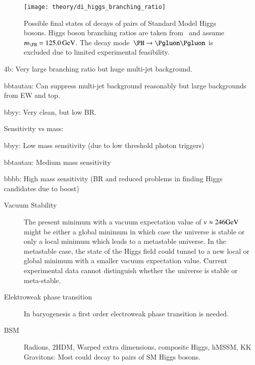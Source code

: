 \begin{figure}[htbp]
  \centering
  \texttt{[image: theory/di\_higgs\_branching\_ratio]}
  \caption{Possible final states of decays of pairs of Standard Model
    Higgs bosons. Higgs boson branching ratios are taken
    from~\cite{deFlorian:2016spz} and
    assume~$m_{\PH} = \SI{125.0}{\GeV}$. The decay
    mode~$\PH \ra \Pgluon\Pgluon$ is excluded due to limited
    experimental feasibility.}
  \label{fig:hh_branching_ratios}
\end{figure}

4b: Very large branching ratio but huge multi-jet background.

bbtautau: Can suppress multi-jet background reasonably but large
backgrounds from EW and top.

bbyy: Very clean, but low BR.

Sensitivity vs mass:

bbyy: Low mass sensitivity (due to low threshold photon triggers)

bbtautau: Medium mass sensitivity

bbbb: High mass sensitivity (BR and reduced problems in finding Higgs
candidates due to boost)


\begin{description}


\item[Vacuum Stability] The present minimum with a vacuum expectation
  value of $v \approx \si{246}{\ensuremath{\text{GeV}}}$ might be either a global minimum
  in which case the universe is stable or only a local minimum which
  leads to a metastable universe. In the metastable case, the state of
  the Higgs field could tunnel to a new local or global minimum with a
  smaller vacuum expectation value. Current experimental data cannot
  distinguish whether the universe is stable or
  meta-stable.

\item[Elektroweak phase transition] In baryogenesis a first order
  electroweak phase transition is needed.

\item[BSM] Radions, 2HDM, Warped extra dimensions, composite Higgs,
  hMSSM, KK Gravitons: Most could decay to pairs of SM Higgs bosons.

\end{description}

